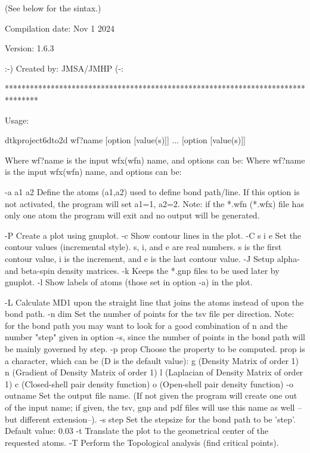                           (See below for the sintax.)

                         Compilation date: Nov  1 2024

                                 Version: 1.6.3

                         :-) Created by: JMSA/JMHP (-:

********************************************************************************


Usage:

	dtkproject6dto2d wf?name [option [value(s)]] ... [option [value(s)]]

Where wf?name is the input wfx(wfn) name, and options can be:
Where wf?name is the input wfx(wfn) name, and options can be:

  -a a1 a2  	Define the atoms  (a1,a2) used to define bond path/line.
            	  If this option is not activated, the program will 
            	  set a1=1, a2=2.
            	  Note: if the *.wfn (*.wfx) file has only one atom
            	  the program will exit and no output will be generated.

  -P        	Create a plot using gnuplot.
  -c        	Show contour lines in the plot.
  -C s i e  	Set the contour values (incremental style).
            	  s, i, and e are real numbers. s is the first
            	  contour value, i is the increment, and 
            	  e is the last contour value.
  -J        	Setup alpha- and beta-spin density matrices.
  -k     	Keeps the *.gnp files to be used later by gnuplot.
  -l     	Show labels of atoms (those set in option -a) in the plot.

  -L        	Calculate MD1 upon the straight line that joins the atoms
            	  instead of upon the bond path.
  -n  dim   	Set the number of points for the tsv file per direction.
            	  Note: for the bond path you may want to look for a good 
            	  combination of n and the number "step" given in option -s,
            	  since the number of points in the bond path will be mainly 
            	  governed by step.
  -p prop   	Choose the property to be computed. prop is a character,
            	  which can be (D is the default value):
         		g (Density Matrix of order 1)
         		n (Gradient of Density Matrix of order 1)
         		l (Laplacian of Density Matrix of order 1)
         		c (Closed-shell pair density function)
         		o (Open-shell pair density function)
  -o outname	Set the output file name.
            	  (If not given the program will create one out of
            	  the input name; if given, the tsv, gnp and pdf files will
            	  use this name as well --but different extension--).
  -s step   	Set the stepsize for the bond path to be 'step'.
            	  Default value: 0.03
  -t        	Translate the plot to the geometrical center of the
            	  requested atoms.
  -T        	Perform the Topological analysis (find critical points).

